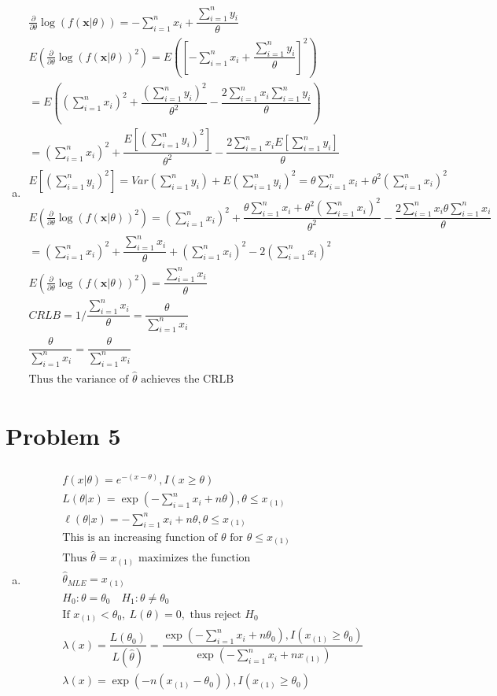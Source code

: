 \documentclass{article}
\newcommand{\pderiv}[2]{\frac{\partial #1}{\partial #2}}
\newcommand{\sumn}{\sum_{i=1}^{n}}
\newcommand{\hth}{\hat{\theta}}
\newcommand{\mle}{\hat{\theta}_{MLE}}
\newcommand{\sumx}{\sum_{i=1}^{n}x_i}
\newcommand{\ta}{\theta}
\newcommand{\dt}{\pderiv{}{\ta}}
\newcommand{\lt}[1]{\log(f(#1|\ta))}
\newcommand{\lx}{\lambda(x)}
\begin{document}
\begin{flushleft}
\begin{enumerate}[(a)]
	\item 
\begin{multline*}\\
\dt\lt{\bm{x}}=-\sumx+\dfrac{\sumn y_i}{\ta}\\
E(\dt\lt{\bm{x}}^2)=E([-\sumx+\dfrac{\sumn y_i}{\ta}]^2)\\
=E\left((\sumx)^2+\dfrac{(\sumn y_i)^2}{\ta^2}-\dfrac{2\sumx \sumn y_i}{\ta}\right)\\
=(\sumx)^2+\dfrac{E[(\sumn y_i)^2]}{\ta^2}-\dfrac{2\sumx E[\sumn y_i]}{\ta}\\
E[(\sumn y_i)^2]=Var(\sumn y_i)+E(\sumn y_i)^2=\ta\sumx+\ta^2(\sumx)^2\\
E(\dt\lt{\bm{x}}^2)=(\sumx)^2+\dfrac{\ta\sumx+\ta^2(\sumx)^2}{\ta^2}-\dfrac{2\sumx \ta\sumx}{\ta}\\
=(\sumx)^2+\dfrac{\sumx}{\ta}+(\sumx)^2-2(\sumx)^2\\
E(\dt\lt{\bm{x}}^2)=\dfrac{\sumx}{\ta}\\
CRLB=1/\dfrac{\sumx}{\ta}=\dfrac{\ta}{\sumx}\\
\dfrac{\ta}{\sumx}=\dfrac{\ta}{\sumx}\\
\text{Thus the variance of } \hth \text{ achieves the CRLB}\\
\end{multline*}


\end{enumerate}

	\section*{Problem 5}
\begin{enumerate}[(a)]
	
	\item 
\begin{multline*}\\
f(x|\ta)=e^{-(x-\ta)}, I(x\geq \ta)\\
L(\ta|x)=\exp\left(-\sumx+n\ta\right), \ta\leq x_{(1)}\\
\ell(\ta|x)=-\sumx+n\ta, \ta\leq x_{(1)}\\
\text{This is an increasing function of } \ta \text{ for } \ta \leq  x_{(1)}\\
\text{Thus } \hth = x_{(1)} \text{ maximizes the function}\\
\mle=x_{(1)}\\
H_0:\ta=\ta_0 \quad H_1:\ta\neq \ta_0\\
\text{If } x_{(1)} < \ta_0, \ L(\ta)=0, \text{ thus reject } H_0\\
\lx=\dfrac{L(\ta_0)}{L(\hth)}=\dfrac{\exp\left(-\sumx+n\ta_0\right),I(x_{(1)}\geq \ta_0)}{\exp\left(-\sumx+nx_{(1)}\right)}\\
\lx=\exp\left(-n(x_{(1)}-\ta_0) \right),I(x_{(1)}\geq \ta_0)\\
\end{multline*}


\end{enumerate}
\end{flushleft}
\end{document}
